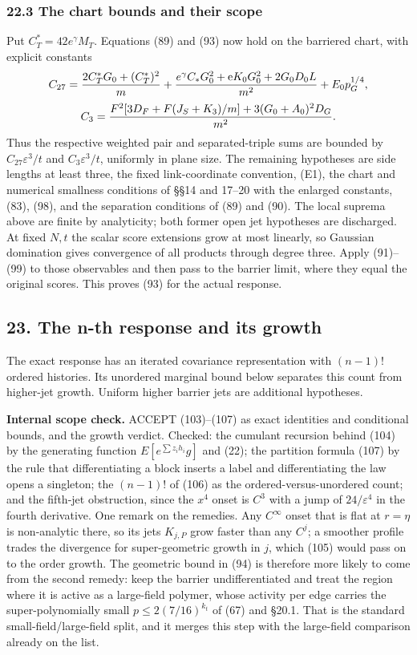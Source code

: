 \documentclass[11pt,a4paper]{article}
\begin{document}
\hypertarget{the-chart-bounds-and-their-scope}{%
\subsubsection{22.3 The chart bounds and their
scope}\label{the-chart-bounds-and-their-scope}}

Put \(C_T^*=42e^\gamma M_T\). Equations (89) and (93) now hold on the
barriered chart, with explicit constants
\[C_{27}={2C_T^*G_0+(C_T^*)^2\over m}
 +{e^\gamma C_*G_0^2+\mathrm eK_0G_0^2+2G_0D_0L\over m^2}
 +E_0p_G^{1/4},\]
\[C_3={F^2[3D_F+F(J_S+K_3)/m]+3(G_0+A_0)^2D_G\over m^2}.\] Thus the
respective weighted pair and separated-triple sums are bounded by
\(C_{27}\varepsilon^3/t\) and \(C_3\varepsilon^3/t\), uniformly in plane
size. The remaining hypotheses are side lengths at least three, the
fixed link-coordinate convention, (E1), the chart and numerical
smallness conditions of §§14 and 17--20 with the enlarged constants,
(83), (98), and the separation conditions of (89) and (90). The local
suprema above are finite by analyticity; both former open jet hypotheses
are discharged. At fixed \(N,t\) the scalar score extensions grow at
most linearly, so Gaussian domination gives convergence of all products
through degree three. Apply (91)--(99) to those observables and then
pass to the barrier limit, where they equal the original scores. This
proves (93) for the actual response.

\hypertarget{the-n-th-response-and-its-growth}{%
\subsection{23. The n-th response and its
growth}\label{the-n-th-response-and-its-growth}}

The exact response has an iterated covariance representation with
\((n-1)!\) ordered histories. Its unordered marginal bound below
separates this count from higher-jet growth. Uniform higher barrier jets
are additional hypotheses.

\textbf{Internal scope check.} ACCEPT (103)--(107) as exact identities
and conditional bounds, and the growth verdict. Checked: the cumulant
recursion behind (104) by the generating function
\(E[e^{\sum z_ih_i}g]\) and (22); the partition formula (107) by the
rule that differentiating a block inserts a label and differentiating
the law opens a singleton; the \((n-1)!\) of (106) as the
ordered-versus-unordered count; and the fifth-jet obstruction, since the
\(x^4\) onset is \(C^3\) with a jump of \(24/\varepsilon^4\) in the
fourth derivative. One remark on the remedies. Any \(C^\infty\) onset
that is flat at \(r=\eta\) is non-analytic there, so its jets
\(K_{j,P}\) grow faster than any \(C^j\); a smoother profile trades the
divergence for super-geometric growth in \(j\), which (105) would pass
on to the order growth. The geometric bound in (94) is therefore more
likely to come from the second remedy: keep the barrier undifferentiated
and treat the region where it is active as a large-field polymer, whose
activity per edge carries the super-polynomially small
\(p\le2(7/16)^{k_t}\) of (67) and §20.1. That is the standard
small-field/large-field split, and it merges this step with the
large-field comparison already on the list.
\end{document}
